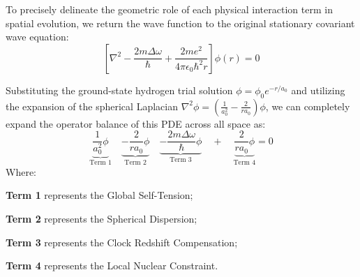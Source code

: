 \documentclass[12pt, a4paper]{article}
\begin{document}
To precisely delineate the geometric role of each physical interaction term in spatial evolution, we return the wave function to the original stationary covariant wave equation:
\begin{equation}
    \left[ \nabla^2 - \frac{2m\Delta\omega}{\hbar} + \frac{2me^2}{4\pi\epsilon_0 \hbar^2 r} \right] \phi(r) = 0 
\end{equation}

Substituting the ground-state hydrogen trial solution $\phi = \phi_0 e^{-r/a_0}$ and utilizing the expansion of the spherical Laplacian $\nabla^2 \phi = \left( \frac{1}{a_0^2} - \frac{2}{r a_0} \right)\phi$, we can completely expand the operator balance of this PDE across all space as:
\begin{equation}
    \underbrace{\frac{1}{a_0^2} \phi}_{\text{Term 1}} \quad \underbrace{- \frac{2}{ra_0} \phi}_{\text{Term 2}} \quad \underbrace{- \frac{2m\Delta\omega}{\hbar} \phi}_{\text{Term 3}} \quad + \quad \underbrace{\frac{2}{ra_0} \phi}_{\text{Term 4}} = 0
\end{equation}
Where:

    \textbf{Term 1} represents the Global Self-Tension;

    \textbf{Term 2} represents the Spherical Dispersion;

    \textbf{Term 3} represents the Clock Redshift Compensation;

    \textbf{Term 4} represents the Local Nuclear Constraint.
\end{document}
